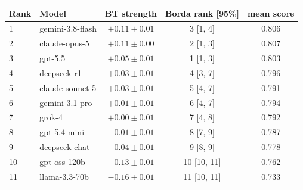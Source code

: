 \begin{tabular}{llccc}
\toprule
Rank & Model & BT strength & Borda rank [95\%] & mean score \\
\midrule
1 & gemini-3.8-flash & $+0.11 \pm 0.01$ & 3 [1, 4] & 0.806 \\
2 & claude-opus-5 & $+0.11 \pm 0.00$ & 2 [1, 3] & 0.807 \\
3 & gpt-5.5 & $+0.05 \pm 0.01$ & 1 [1, 3] & 0.803 \\
4 & deepseek-r1 & $+0.03 \pm 0.01$ & 4 [3, 7] & 0.796 \\
5 & claude-sonnet-5 & $+0.03 \pm 0.01$ & 5 [4, 7] & 0.791 \\
6 & gemini-3.1-pro & $+0.01 \pm 0.01$ & 6 [4, 7] & 0.794 \\
7 & grok-4 & $+0.00 \pm 0.01$ & 7 [4, 8] & 0.792 \\
8 & gpt-5.4-mini & $-0.01 \pm 0.01$ & 8 [7, 9] & 0.787 \\
9 & deepseek-chat & $-0.04 \pm 0.01$ & 9 [8, 9] & 0.778 \\
10 & gpt-oss-120b & $-0.13 \pm 0.01$ & 10 [10, 11] & 0.762 \\
11 & llama-3.3-70b & $-0.16 \pm 0.01$ & 11 [10, 11] & 0.733 \\
\bottomrule
\end{tabular}
